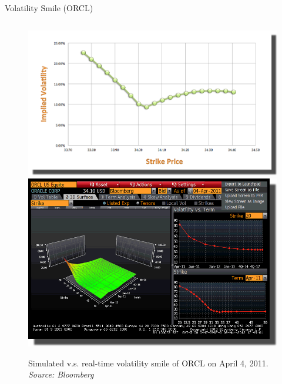 \documentclass{beamer}
\begin{document}
\begin{frame}[shrink=50]{{\color{cyan}Volatility Smile ({\color{magenta}ORCL})}}
\begin{columns}
\begin{column}{0.7\textwidth}
\begin{figure}[htbp]
                \centering
                \includegraphics[height=0.75\textheight]{ORCL/ORCL_20110404_Simulated_Volatility_Smile.png}\\
                \includegraphics[height=0.75\textheight]{ORCL/ORCL_20110404_B.png}\\
                \caption{Simulated v.s. real-time volatility smile of ORCL on April 4, 2011. \textit{Source: Bloomberg}}
                \label{fig:ORCL_VolSmile_SimvsReal}
\end{figure}
\end{column}
\end{columns}

\end{frame}
\end{document}
